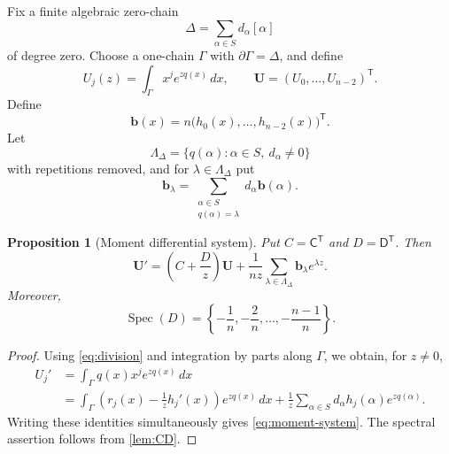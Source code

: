 \documentclass[11pt]{article}
\numberwithin{equation}{section}
\newtheorem{proposition}[proposition]{Proposition}
\theoremstyle{definition}
\theoremstyle{remark}
\newcommand{\Spec}{\operatorname{Spec}}
\begin{document}
Fix a finite algebraic zero-chain
\begin{equation}\label{eq:Delta-fixed}
  \Delta=\sum_{\alpha\in S}d_\alpha[\alpha]
\end{equation}
of degree zero.  Choose a one-chain $\Gamma$ with
$\partial\Gamma=\Delta$, and define
\begin{equation}\label{eq:Uj}
  U_j(z)=\int_\Gamma x^j e^{zq(x)}\,dx,
  \qquad
  \mathbf U=(U_0,\ldots,U_{n-2})^{\mathsf T}.
\end{equation}
Define
\begin{equation}\label{eq:b-x}
  \mathbf b(x)=n\bigl(h_0(x),\ldots,h_{n-2}(x)\bigr)^{\mathsf T}.
\end{equation}
Let
\begin{equation}\label{eq:Lambda-Delta}
  \Lambda_\Delta=
  \{q(\alpha):\alpha\in S,\ d_\alpha\ne0\}
\end{equation}
with repetitions removed, and for $\lambda\in\Lambda_\Delta$ put
\begin{equation}\label{eq:b-lambda}
  \mathbf b_\lambda
  =\sum_{\substack{\alpha\in S\\q(\alpha)=\lambda}}
    d_\alpha\mathbf b(\alpha).
\end{equation}

\begin{proposition}[Moment differential system]\label{prop:moment-system}
Put $C=\mathsf C^{\mathsf T}$ and $D=\mathsf D^{\mathsf T}$.  Then
\begin{equation}\label{eq:moment-system}
  \mathbf U'
  =\left(C+\frac Dz\right)\mathbf U
   +\frac1{nz}\sum_{\lambda\in\Lambda_\Delta}
      \mathbf b_\lambda e^{\lambda z}.
\end{equation}
Moreover,
\begin{equation}\label{eq:D-spectrum}
  \Spec(D)=
  \left\{-\frac1n,-\frac2n,\ldots,-\frac{n-1}{n}\right\}.
\end{equation}
\end{proposition}

\begin{proof}
Using \eqref{eq:division} and integration by parts along $\Gamma$, we obtain,
for $z\ne0$,
\begin{align*}
  U_j'
  &=\int_\Gamma q(x)x^j e^{zq(x)}\,dx\\
  &=\int_\Gamma\left(r_j(x)-\frac1z h_j'(x)\right)e^{zq(x)}\,dx
    +\frac1z\sum_{\alpha\in S}
      d_\alpha h_j(\alpha)e^{zq(\alpha)}.
\end{align*}
Writing these identities simultaneously gives \eqref{eq:moment-system}.
The spectral assertion follows from \cref{lem:CD}.
\end{proof}
\end{document}
